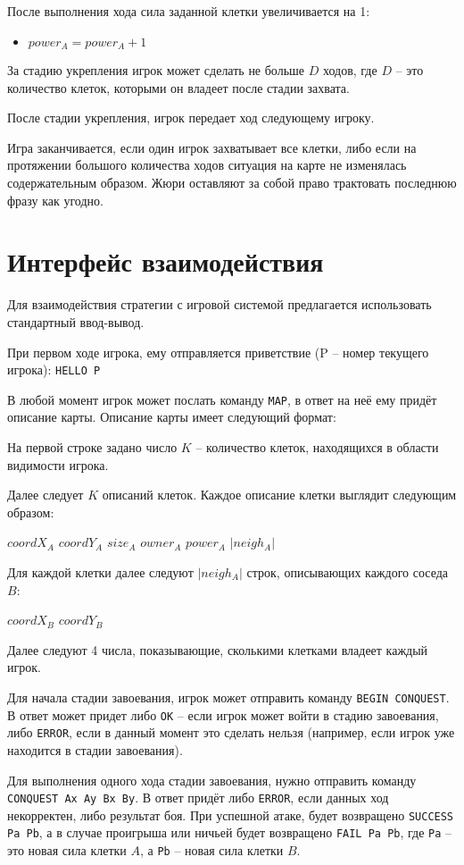\documentclass[12pt, a4paper]{article}
\begin{document}
После выполнения хода сила заданной клетки увеличивается на 1:

\begin{itemize}
\item $power_A = power_A + 1$
\end{itemize}

За стадию укрепления игрок может сделать не больше $D$ ходов, где $D$ -- это количество клеток, которыми он владеет после стадии захвата.

После стадии укрепления, игрок передает ход следующему игроку.

Игра заканчивается, если один игрок захватывает все клетки, либо если на протяжении большого количества ходов ситуация на карте не изменялась содержательным образом. Жюри оставляют за собой право трактовать последнюю фразу как угодно.

{\section{Интерфейс взаимодействия}}

Для взаимодействия стратегии с игровой системой предлагается использовать стандартный ввод-вывод.

При первом ходе игрока, ему отправляется приветствие (P -- номер текущего игрока): \texttt{HELLO P}

В любой момент игрок может послать команду \texttt{MAP}, в ответ на неё ему придёт описание карты. Описание карты имеет следующий формат:

На первой строке задано число $K$ -- количество клеток, находящихся в области видимости игрока.

Далее следует $K$ описаний клеток. Каждое описание клетки выглядит следующим образом:

$coordX_A$ $coordY_A$ $size_A$ $owner_A$ $power_A$ $|{neigh_A}|$

Для каждой клетки далее следуют $|{neigh_A}|$ строк, описывающих каждого соседа $B$:

$coordX_B$ $coordY_B$

Далее следуют 4 числа, показывающие, сколькими клетками владеет каждый игрок.

Для начала стадии завоевания, игрок может отправить команду \texttt{BEGIN CONQUEST}. В ответ может придет либо \texttt{OK} -- если игрок может войти в стадию завоевания, либо \texttt{ERROR}, если в данный момент это сделать нельзя (например, если игрок уже находится в стадии завоевания).

Для выполнения одного хода стадии завоевания, нужно отправить команду \texttt{CONQUEST Ax Ay Bx By}. В ответ придёт либо \texttt{ERROR}, если данных ход некорректен, либо результат боя. При успешной атаке, будет возвращено \texttt{SUCCESS Pa Pb}, а в случае проигрыша или ничьей будет возвращено \texttt{FAIL Pa Pb}, где \texttt{Pa} -- это новая сила клетки $A$, а \texttt{Pb} -- новая сила клетки $B$.
\end{document}
